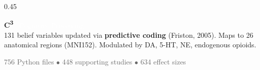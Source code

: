 \documentclass[aspectratio=169, 12pt]{beamer}
\begin{document}
\begin{frame}
\begin{columns}[T]
\begin{column}{0.45\textwidth}
\vspace{0.35cm}

\textcolor{c3orange}{\textbf{C\textsuperscript{3}}} \textcolor{white}{\textemdash\ Cognitive Processing}\\[3pt]
{\footnotesize 131 belief variables updated via \textbf{predictive coding} (Friston, 2005). Maps to 26 anatomical regions (MNI152). Modulated by DA, 5-HT, NE, endogenous opioids.}

\vspace{0.35cm}

{\footnotesize\textcolor{dimgray}{756 Python files \(\bullet\) 448 supporting studies \(\bullet\) 634 effect sizes}}

\end{column}
\end{columns}
\end{frame}
\end{document}
